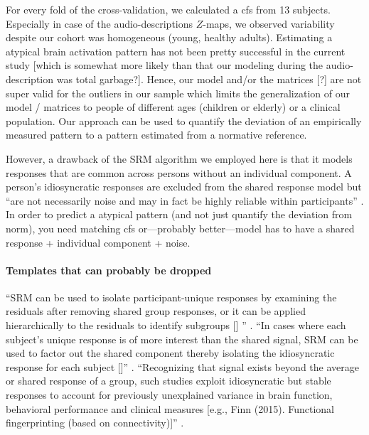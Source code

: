 %
For every fold of the cross-validation, we calculated a \ac{cfs} from 13
subjects.
%
Especially in case of the audio-descriptions $Z$-maps, we observed variability
despite our cohort was homogeneous (young, healthy adults).
%
Estimating a atypical brain activation pattern has not been pretty successful in
the current study [which is somewhat more likely than that our modeling during
the audio-description was total garbage?].
%
Hence, our model and/or the matrices [?] are not super valid for the outliers in
our sample which limits the generalization of our model / matrices to people of
different ages (children or elderly) or a clinical population.
%
Our approach can be used to quantify the deviation of an empirically measured
pattern to a pattern estimated from a normative reference.
%

However, a drawback of the SRM algorithm we employed here is that it models
responses that are common across persons without an individual component.
%
A person's idiosyncratic responses are excluded from the shared response model
but ``are not necessarily noise and may in fact be highly reliable within
participants'' \citep{cohen2017computational}.
%
In order to predict a atypical pattern (and not just quantify the deviation from
norm), you need matching \ac{cfs} or---probably better---model has to have a
shared response + individual component + noise.


\paragraph{Templates that can probably be dropped}
%
``SRM can be used to isolate participant-unique responses by examining the
residuals after removing shared group responses, or it can be applied
hierarchically to the residuals to identify subgroups [\citet{chen2017shared}]
'' \citep{cohen2017computational}.
%
``In cases where each subject's unique response is of more interest than the
shared signal, SRM can be used to factor out the shared component thereby
isolating the idiosyncratic response for each subject
[\citep{chen2015reduced}]'' \citep{kumar2020brainiak}.
%
``Recognizing that signal exists beyond the average or shared response of a
group, such studies exploit idiosyncratic but stable responses to account for
previously unexplained variance in brain function, behavioral performance and
clinical measures [e.g., Finn (2015). Functional fingerprinting (based on
connectivity)]'' \citep{cohen2017computational}.




